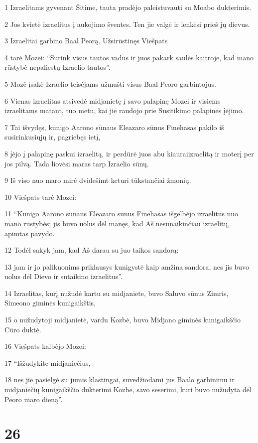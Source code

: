 \par 1 Izraelitams gyvenant Šitime, tauta pradėjo paleistuvauti su Moabo dukterimis. 
\par 2 Jos kvietė izraelitus į aukojimo šventes. Ten jie valgė ir lenkėsi prieš jų dievus. 
\par 3 Izraelitai garbino Baal Peorą. Užsirūstinęs Viešpats 
\par 4 tarė Mozei: “Surink visus tautos vadus ir juos pakark saulės kaitroje, kad mano rūstybė nepaliestų Izraelio tautos”. 
\par 5 Mozė įsakė Izraelio teisėjams užmušti visus Baal Peoro garbintojus. 
\par 6 Vienas izraelitas atsivedė midjanietę į savo palapinę Mozei ir visiems izraelitams matant, tuo metu, kai jie raudojo prie Susitikimo palapinės įėjimo. 
\par 7 Tai išvydęs, kunigo Aarono sūnaus Eleazaro sūnus Finehasas pakilo iš susirinkusiųjų ir, pagriebęs ietį, 
\par 8 įėjo į palapinę paskui izraelitą, ir perdūrė juos abu kiaurai­izraelitą ir moterį per jos pilvą. Tada liovėsi maras tarp Izraelio sūnų. 
\par 9 Iš viso nuo maro mirė dvidešimt keturi tūkstančiai žmonių. 
\par 10 Viešpats tarė Mozei: 
\par 11 “Kunigo Aarono sūnaus Eleazaro sūnus Finehasas išgelbėjo izraelitus nuo mano rūstybės; jis buvo uolus dėl manęs, kad Aš nesunaikinčiau izraelitų, apimtas pavydo. 
\par 12 Todėl sakyk jam, kad Aš darau su juo taikos sandorą: 
\par 13 jam ir jo palikuonims priklausys kunigystė kaip amžina sandora, nes jis buvo uolus dėl Dievo ir sutaikino izraelitus”. 
\par 14 Izraelitas, kurį nužudė kartu su midjaniete, buvo Saluvo sūnus Zimris, Simeono giminės kunigaikštis, 
\par 15 o nužudytoji midjanietė, vardu Kozbė, buvo Midjano giminės kunigaikščio Cūro duktė. 
\par 16 Viešpats kalbėjo Mozei: 
\par 17 “Išžudykite midjaniečius, 
\par 18 nes jie pasielgė su jumis klastingai, suvedžiodami jus Baalo garbinimu ir midjaniečių kunigaikščio dukterimi Kozbe, savo seserimi, kuri buvo nužudyta dėl Peoro maro dieną”.



\chapter{26}

